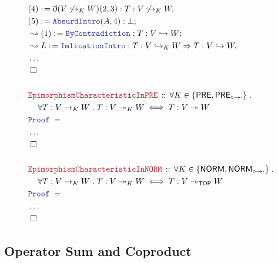 \documentclass[12pt]{scrartcl}
\newcommand{\LOGIC}[1]{\textcolor{Blue}{\mathtt{#1}}}
\newcommand{\THM}[1]{\textcolor{Maroon}{\mathtt{#1}}}
\renewcommand{\.}{\; . \;}
\newcommand{\de}{: \kern 0.1pc =}
\newcommand{\Theorem}[2]{& \THM{#1} \, :: \, #2 \\ & \Proof = \\ }
\newcommand{\NewLine}{\\ & \kern 1pc}
\newcommand{\Page}[1]{\begin{align*} #1 \end{align*} \newpage   }
\newcommand{ \bd }{ \ByDef }
\newcommand{\NoProof}{ & \ldots \\ \EndProof}
\newcommand{\ToInj}{\hookrightarrow}
\newcommand{\ToSurj}{\twoheadrightarrow}
\newcommand{\Say}[3]{& #1 \de #2 : #3, \\}
\newcommand{\Conclude}[3]{& #1 \de #2 : #3; \\}
\newcommand{\Derive}[3]{& \leadsto #1 \de #2 : #3, \\}
\newcommand{\DeriveConclude}[3]{& \leadsto #1 \de #2 : #3 ; \\}
\newcommand{\QED}{\; \square}
\newcommand{\EndProof}{& \QED \\}
\newcommand{\ByDef}{\eth}
\newcommand{\Proof}{\LOGIC{Proof} \; }
\newcommand{\TOP}{\mathsf{TOP}}
\newcommand{\PRE}{\mathsf{PRE}} %
\newcommand{\PREI}{\mathsf{PRE}_{\circ \to \cdot}} %
\newcommand{\NORM}{\mathsf{NORM}} %
\newcommand{\NORMI}{\mathsf{NORM}_{\circ \to \cdot}} %
\begin{document}
    \Page{
       \Say{(4)}{ \bd(V \not \ToInj_K W)(2,3)}{T : V \not \ToInj_K W}
       \Conclude{(5)}{\LOGIC{AbsurdIntro}(A,4)}{\bot}
       \DeriveConclude{(1)}{\LOGIC{ByContradiction}}{T : V \ToInj W }
       \Derive{L}{\LOGIC{ImlicationIntro}}{T  : V \ToInj_K W  \Rightarrow
      T : V \ToInj W}
      \NoProof
      \\
     \Theorem{EpimorphismCharacteristicInPRE}{\forall K \in \{ \PRE, \PREI \} \.
      \NewLine \forall T : V \to_K W \. T  : V \ToSurj_K W  \iff
      T : V \ToSurj W  }
      \NoProof
      \\ 
      \Theorem{EpimorphismCharacteristicInNORM}{\forall K \in \{ \NORM, \NORMI \} \.
      \NewLine \forall T : V \to_K W \. T  : V \ToSurj_K W  \iff
      T : V \ToSurj_{\TOP} W  }
      \NoProof
      }
     \subsection{Operator Sum and Coproduct}
\end{document}
